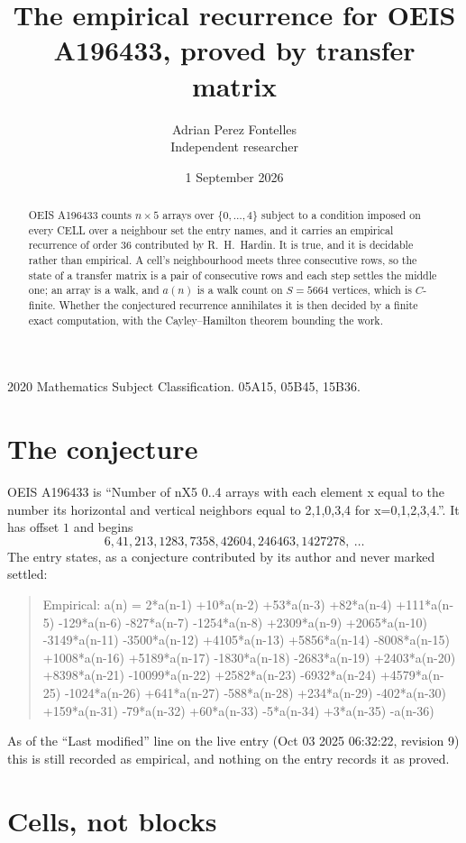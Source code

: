 \documentclass[11pt,a4paper]{article}
\title{The empirical recurrence for OEIS A196433, proved by transfer matrix}
\author{Adrian Perez Fontelles\\ \small Independent researcher}
\date{1 September 2026}
\theoremstyle{plain}
\theoremstyle{definition}
\begin{document}
\maketitle

\begin{abstract}
OEIS A196433 counts $n\times5$ arrays over $\{0,\dots,4\}$ subject to a condition imposed on
every CELL over a neighbour set the entry names, and it carries an empirical recurrence of
order $36$ contributed by R.~H.~Hardin. It is true, and it is decidable rather than
empirical. A cell's neighbourhood meets three consecutive rows, so the state of a transfer
matrix is a pair of consecutive rows and each step settles the middle one; an array is a
walk, and $a(n)$ is a walk count on $S=5664$ vertices, which is $C$-finite. Whether the
conjectured recurrence annihilates it is then decided by a finite exact computation, with the
Cayley--Hamilton theorem bounding the work.
\end{abstract}

\noindent\small 2020 Mathematics Subject Classification. 05A15, 05B45, 15B36.\normalsize

\section{The conjecture}

OEIS A196433 is ``Number of nX5 0..4 arrays with each element x equal to the number its horizontal and vertical neighbors equal to 2,1,0,3,4 for x=0,1,2,3,4.''. It has offset $1$ and begins
\[
6, 41, 213, 1283, 7358, 42604, 246463, 1427278,\ \dots
\]
The entry states, as a conjecture contributed by its author and never marked settled:
\begin{quote}
Empirical: a(n) = 2*a(n-1) +10*a(n-2) +53*a(n-3) +82*a(n-4) +111*a(n-5) -129*a(n-6) -827*a(n-7) -1254*a(n-8) +2309*a(n-9) +2065*a(n-10) -3149*a(n-11) -3500*a(n-12) +4105*a(n-13) +5856*a(n-14) -8008*a(n-15) +1008*a(n-16) +5189*a(n-17) -1830*a(n-18) -2683*a(n-19) +2403*a(n-20) +8398*a(n-21) -10099*a(n-22) +2582*a(n-23) -6932*a(n-24) +4579*a(n-25) -1024*a(n-26) +641*a(n-27) -588*a(n-28) +234*a(n-29) -402*a(n-30) +159*a(n-31) -79*a(n-32) +60*a(n-33) -5*a(n-34) +3*a(n-35) -a(n-36)
\end{quote}
As of the ``Last modified'' line on the live entry (Oct 03 2025 06:32:22, revision 9) this is still
recorded as empirical, and nothing on the entry records it as proved.

\section{Cells, not blocks}
\end{document}
